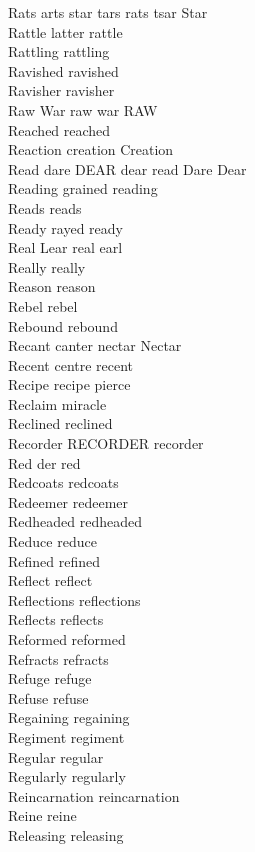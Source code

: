 Rats arts star tars rats tsar Star\\
Rattle latter rattle\\
Rattling rattling\\
Ravished ravished\\
Ravisher ravisher\\
Raw War raw war RAW\\
Reached reached\\
Reaction creation Creation\\
Read dare DEAR dear read Dare Dear\\
Reading grained reading\\
Reads reads\\
Ready rayed ready\\
Real Lear real earl\\
Really really\\
Reason reason\\
Rebel rebel\\
Rebound rebound\\
Recant canter nectar Nectar\\
Recent centre recent\\
Recipe recipe pierce\\
Reclaim miracle\\
Reclined reclined\\
Recorder RECORDER recorder\\
Red der red\\
Redcoats redcoats\\
Redeemer redeemer\\
Redheaded redheaded\\
Reduce reduce\\
Refined refined\\
Reflect reflect\\
Reflections reflections\\
Reflects reflects\\
Reformed reformed\\
Refracts refracts\\
Refuge refuge\\
Refuse refuse\\
Regaining regaining\\
Regiment regiment\\
Regular regular\\
Regularly regularly\\
Reincarnation reincarnation\\
Reine reine\\
Releasing releasing\\
